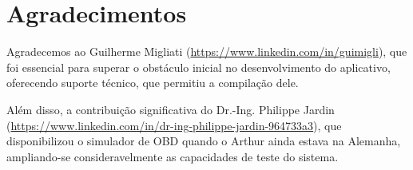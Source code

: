 \chapter*{Agradecimentos}

\noindent
Agradecemos ao Guilherme Migliati (\url{https://www.linkedin.com/in/guimigli}), que foi essencial para superar o obstáculo inicial no desenvolvimento do aplicativo, oferecendo suporte técnico, que permitiu a compilação dele.

\noindent 
Além disso, a contribuição significativa do Dr.-Ing. Philippe Jardin (\url{https://www.linkedin.com/in/dr-ing-philippe-jardin-964733a3}), que disponibilizou o simulador de OBD quando o Arthur ainda estava na Alemanha, ampliando-se consideravelmente as capacidades de teste do sistema. 
